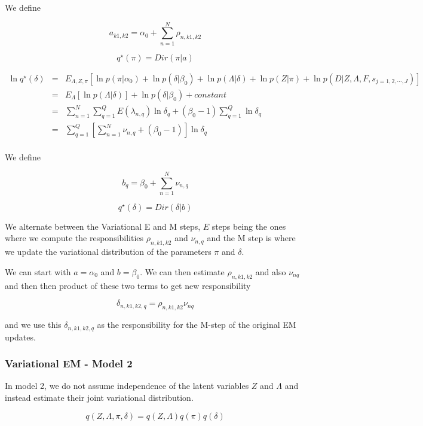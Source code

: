 \documentclass[12pt]{article}
\begin{document}
We define 

$$ a_{k1,k2} = \alpha_0 + \sum_{n=1}^{N} \rho_{n,k1,k2} $$

$$ q^{\star} (\pi) = Dir(\pi | a)  $$


\begin{eqnarray} \nonumber
\ln q^{\star} (\delta) & = & E_{\Lambda, Z, \pi} \left [ \ln p(\pi|\alpha_0)+ \ln p(\delta | \beta_0) + \ln p(\Lambda | \delta) + \ln p(Z | \pi) + \ln p(D | Z, \Lambda, F, s_{j=1,2,\cdots,J}) \right ] \\  \nonumber
  & = & E_{\Lambda} \left [ \ln p(\Lambda | \delta) \right] + \ln p(\delta | \beta_0) + constant \\ \nonumber
  & = & \sum_{n=1}^{N}\sum_{q=1}^{Q} E(\lambda_{n,q}) \ln \delta_{q} + (\beta_0 -1) \sum_{q=1}^{Q} \ln \delta_{q} \\ \nonumber
  & = & \sum_{q=1}^{Q} \left [ \sum_{n=1}^{N} \nu_{n,q} + (\beta_0 -1) \right] \ln \delta_{q} \\ \nonumber
\end{eqnarray}

We define 

$$ b_{q} = \beta_0 + \sum_{n=1}^{N} \nu_{n,q} $$

$$ q^{\star} (\delta) = Dir(\delta | b)  $$


We alternate between the Variational E and M steps, $E$ steps being the ones where we compute the responsibilities $\rho_{n,k1,k2}$ and $\nu_{n,q}$ and the M step is where we update the variational distribution of the parameters $\pi$ and $\delta$. 

We can start with $a= \alpha_0$ and $b=\beta_0$. We can then estimate $\rho_{n,k1,k2}$ and also $\nu_{nq}$ and then then product of these two terms to get new responsibility

$$ \delta_{n, k1, k2, q} = \rho_{n, k1, k2} \nu_{nq} $$

and we use this $\delta_{n, k1, k2, q}$ as the responsibility for the M-step of the original EM updates. 

\subsubsection{Variational EM  - Model 2}

In model 2, we do not assume independence of the latent variables $Z$ and $\Lambda$ and instead estimate their joint variational distribution. 

$$ q(Z, \Lambda, \pi, \delta) = q(Z, \Lambda) q(\pi) q(\delta) $$
\end{document}
